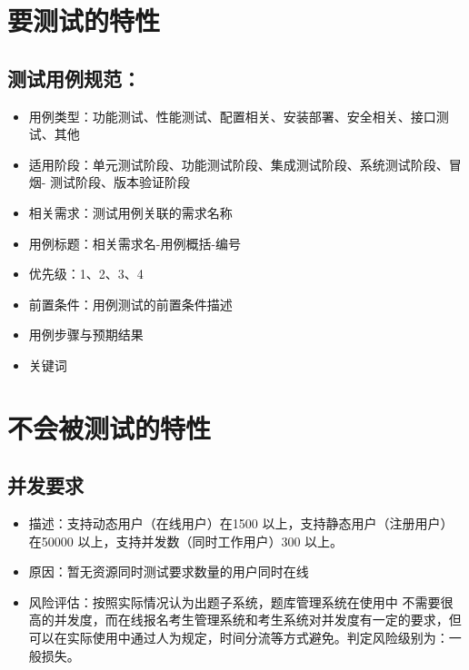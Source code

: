 \documentclass[hyperref, a4paper]{ctexart}
\providecommand{\tightlist}{%
  \setlength{\itemsep}{0pt}\setlength{\parskip}{0pt}}
\begin{document}
\hypertarget{ux8981ux6d4bux8bd5ux7684ux7279ux6027}{%
\section{要测试的特性}\label{ux8981ux6d4bux8bd5ux7684ux7279ux6027}}

\hypertarget{ux6d4bux8bd5ux7528ux4f8bux89c4ux8303}{%
\subsection{测试用例规范：}\label{ux6d4bux8bd5ux7528ux4f8bux89c4ux8303}}

\begin{itemize}
\tightlist
\item
  用例类型：功能测试、性能测试、配置相关、安装部署、安全相关、接口测试、其他
\item
  适用阶段：单元测试阶段、功能测试阶段、集成测试阶段、系统测试阶段、冒烟-
  测试阶段、版本验证阶段
\item
  相关需求：测试用例关联的需求名称
\item
  用例标题：相关需求名-用例概括-编号
\item
  优先级：1、2、3、4
\item
  前置条件：用例测试的前置条件描述
\item
  用例步骤与预期结果
\item
  关键词
\end{itemize}

\hypertarget{ux4e0dux4f1aux88abux6d4bux8bd5ux7684ux7279ux6027}{%
\section{不会被测试的特性}\label{ux4e0dux4f1aux88abux6d4bux8bd5ux7684ux7279ux6027}}

\hypertarget{ux5e76ux53d1ux8981ux6c42-1}{%
\subsection{并发要求}\label{ux5e76ux53d1ux8981ux6c42-1}}

\begin{itemize}
\tightlist
\item
  描述：支持动态用户（在线用户）在1500 以上，支持静态用户（注册用户）
  在50000 以上，支持并发数（同时工作用户）300 以上。
\item
  原因：暂无资源同时测试要求数量的用户同时在线
\item
  风险评估：按照实际情况认为出题子系统，题库管理系统在使用中
  不需要很高的并发度，而在线报名考生管理系统和考生系统对并发度有一定的要求，但可以在实际使用中通过人为规定，时间分流等方式避免。判定风险级别为：一般损失。
\end{itemize}
\end{document}
